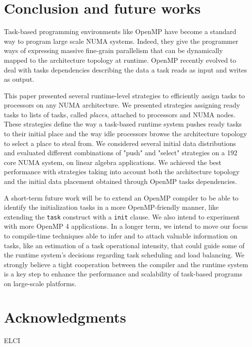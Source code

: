 \documentclass{Styles/llncs}
\begin{document}

\section{Conclusion and future works}
Task-based programming environments like OpenMP have become a standard way to program large scale NUMA systems.
Indeed, they give the programmer ways of expressing massive fine-grain parallelism that can be dynamically mapped to the architecture topology at runtime.
OpenMP recently evolved to deal with tasks dependencies describing the data a task reads as input and writes as output. 

This paper presented several runtime-level strategies to efficiently assign tasks to processors on any NUMA architecture. We presented strategies assigning ready tasks to lists of tasks, called \emph{places}, attached to processors and NUMA nodes. These strategies define the way a task-based runtime system pushes ready tasks to their initial place and the way idle processors browse the architecture topology to select a place to steal from. We considered several initial data distributions and evaluated different combinations of "push" and "select" strategies on a 192 core NUMA system, on linear algebra applications. We achieved the best performance with strategies taking into account both the architecture topology and the initial data placement obtained through OpenMP tasks dependencies.

A short-term future work will be to extend an OpenMP compiler to be able to identify the initialization tasks in a more OpenMP-friendly manner, like extending the \verb!task! construct with a \verb!init! clause. We also intend to experiment with more OpenMP 4 applications.
In a longer term, we intend to move our focus to compile-time techniques able to infer and to attach valuable information on tasks, like an estimation of a task operational intensity, that could guide some of the runtime system's decisions regarding task scheduling and load balancing. We strongly believe a tight cooperation between the compiler and the runtime system is a key step to enhance the performance and scalability of task-based programs on large-scale platforms.

\section*{Acknowledgments}

ELCI
  \small 
  
\end{document}
